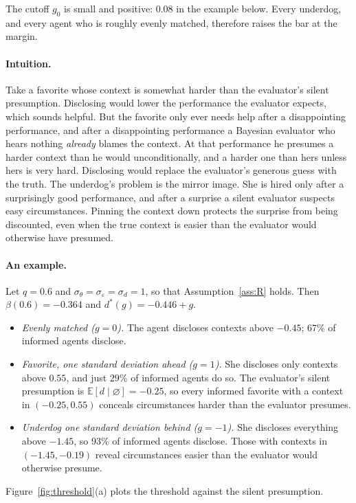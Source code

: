 \documentclass[11pt]{article}
\theoremstyle{definition}
\newcommand{\E}{\mathbb{E}}
\newcommand{\sil}{\varnothing}
\newcommand{\sd}{\sigma_d}
\newcommand{\sth}{\sigma_\theta}
\newcommand{\se}{\sigma_\varepsilon}
\begin{document}
The cutoff $g_0$ is small and positive: $0.08$ in the example below. Every underdog, and every agent who is roughly evenly matched, therefore raises the bar at the margin.

\paragraph{Intuition.} Take a favorite whose context is somewhat harder than the evaluator's silent presumption. Disclosing would lower the performance the evaluator expects, which sounds helpful. But the favorite only ever needs help after a disappointing performance, and after a disappointing performance a Bayesian evaluator who hears nothing \emph{already} blames the context. At that performance he presumes a harder context than he would unconditionally, and a harder one than hers unless hers is very hard. Disclosing would replace the evaluator's generous guess with the truth. The underdog's problem is the mirror image. She is hired only after a surprisingly good performance, and after a surprise a silent evaluator suspects easy circumstances. Pinning the context down protects the surprise from being discounted, even when the true context is easier than the evaluator would otherwise have presumed.

\paragraph{An example.} Let $q=0.6$ and $\sth=\se=\sd=1$, so that Assumption~\ref{ass:R} holds. Then $\beta(0.6)=-0.364$ and $d^*(g)=-0.446+g$.
\begin{itemize}
\item \emph{Evenly matched ($g=0$).} The agent discloses contexts above $-0.45$; $67\%$ of informed agents disclose.
\item \emph{Favorite, one standard deviation ahead ($g=1$).} She discloses only contexts above $0.55$, and just $29\%$ of informed agents do so. The evaluator's silent presumption is $\E[d\mid\sil]=-0.25$, so every informed favorite with a context in $(-0.25,0.55)$ conceals circumstances harder than the evaluator presumes.
\item \emph{Underdog one standard deviation behind ($g=-1$).} She discloses everything above $-1.45$, so $93\%$ of informed agents disclose. Those with contexts in $(-1.45,-0.19)$ reveal circumstances easier than the evaluator would otherwise presume.
\end{itemize}
Figure~\ref{fig:threshold}(a) plots the threshold against the silent presumption.
\end{document}
